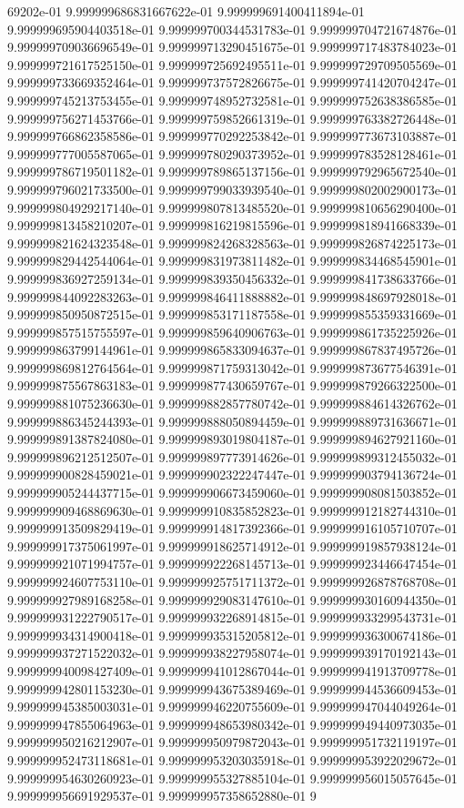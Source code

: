 69202e-01	9.999999686831667622e-01	9.999999691400411894e-01	9.999999695904403518e-01	9.999999700344531783e-01	9.999999704721674876e-01	9.999999709036696549e-01	9.999999713290451675e-01	9.999999717483784023e-01	9.999999721617525150e-01	9.999999725692495511e-01	9.999999729709505569e-01	9.999999733669352464e-01	9.999999737572826675e-01	9.999999741420704247e-01	9.999999745213753455e-01	9.999999748952732581e-01	9.999999752638386585e-01	9.999999756271453766e-01	9.999999759852661319e-01	9.999999763382726448e-01	9.999999766862358586e-01	9.999999770292253842e-01	9.999999773673103887e-01	9.999999777005587065e-01	9.999999780290373952e-01	9.999999783528128461e-01	9.999999786719501182e-01	9.999999789865137156e-01	9.999999792965672540e-01	9.999999796021733500e-01	9.999999799033939540e-01	9.999999802002900173e-01	9.999999804929217140e-01	9.999999807813485520e-01	9.999999810656290400e-01	9.999999813458210207e-01	9.999999816219815596e-01	9.999999818941668339e-01	9.999999821624323548e-01	9.999999824268328563e-01	9.999999826874225173e-01	9.999999829442544064e-01	9.999999831973811482e-01	9.999999834468545901e-01	9.999999836927259134e-01	9.999999839350456332e-01	9.999999841738633766e-01	9.999999844092283263e-01	9.999999846411888882e-01	9.999999848697928018e-01	9.999999850950872515e-01	9.999999853171187558e-01	9.999999855359331669e-01	9.999999857515755597e-01	9.999999859640906763e-01	9.999999861735225926e-01	9.999999863799144961e-01	9.999999865833094637e-01	9.999999867837495726e-01	9.999999869812764564e-01	9.999999871759313042e-01	9.999999873677546391e-01	9.999999875567863183e-01	9.999999877430659767e-01	9.999999879266322500e-01	9.999999881075236630e-01	9.999999882857780742e-01	9.999999884614326762e-01	9.999999886345244393e-01	9.999999888050894459e-01	9.999999889731636671e-01	9.999999891387824080e-01	9.999999893019804187e-01	9.999999894627921160e-01	9.999999896212512507e-01	9.999999897773914626e-01	9.999999899312455032e-01	9.999999900828459021e-01	9.999999902322247447e-01	9.999999903794136724e-01	9.999999905244437715e-01	9.999999906673459060e-01	9.999999908081503852e-01	9.999999909468869630e-01	9.999999910835852823e-01	9.999999912182744310e-01	9.999999913509829419e-01	9.999999914817392366e-01	9.999999916105710707e-01	9.999999917375061997e-01	9.999999918625714912e-01	9.999999919857938124e-01	9.999999921071994757e-01	9.999999922268145713e-01	9.999999923446647454e-01	9.999999924607753110e-01	9.999999925751711372e-01	9.999999926878768708e-01	9.999999927989168258e-01	9.999999929083147610e-01	9.999999930160944350e-01	9.999999931222790517e-01	9.999999932268914815e-01	9.999999933299543731e-01	9.999999934314900418e-01	9.999999935315205812e-01	9.999999936300674186e-01	9.999999937271522032e-01	9.999999938227958074e-01	9.999999939170192143e-01	9.999999940098427409e-01	9.999999941012867044e-01	9.999999941913709778e-01	9.999999942801153230e-01	9.999999943675389469e-01	9.999999944536609453e-01	9.999999945385003031e-01	9.999999946220755609e-01	9.999999947044049264e-01	9.999999947855064963e-01	9.999999948653980342e-01	9.999999949440973035e-01	9.999999950216212907e-01	9.999999950979872043e-01	9.999999951732119197e-01	9.999999952473118681e-01	9.999999953203035918e-01	9.999999953922029672e-01	9.999999954630260923e-01	9.999999955327885104e-01	9.999999956015057645e-01	9.999999956691929537e-01	9.999999957358652880e-01	9